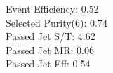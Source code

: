 Event Efficiency:   0.52\\ 
Selected Purity(6): 0.74\\ 
Passed Jet S/T:     4.62\\ 
Passed Jet MR:      0.06\\ 
Passed Jet Eff:     0.54